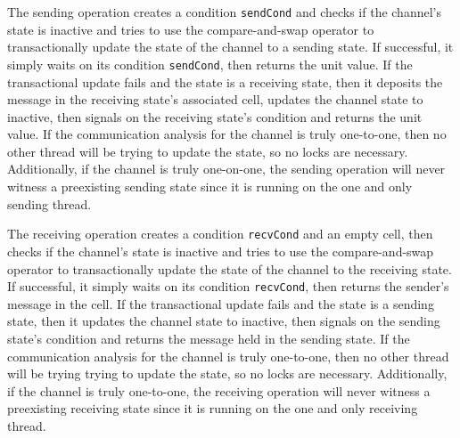 \documentclass[letterpaper, 11pt]{extarticle}
\begin{document}
The sending operation creates a condition \lstinline{sendCond} and checks
if the channel's state is inactive and tries to use the
compare-and-swap operator to transactionally update the state of the channel to a
sending state.
If successful, it simply waits on its condition \lstinline{sendCond}, then returns the unit value.
If the transactional update fails and the state is a receiving state,
then it deposits the message in the receiving state's associated cell,
updates the channel state to inactive, then signals on the receiving state's 
condition and returns the unit value.
If the communication analysis for the channel is
truly one-to-one, then no other thread will be trying to update the state, so no locks are necessary.
Additionally, if the channel is truly one-on-one, the sending operation will never
witness a preexisting sending state since it is running on the one and only sending thread. 

The receiving operation creates a condition \lstinline{recvCond} and an empty cell,
then checks if the channel's state is inactive and tries to use the
compare-and-swap operator to transactionally update the state of the channel to
the receiving state. If successful, it simply waits on its condition \lstinline{recvCond},
then returns the sender's message in the cell.
If the transactional update fails and the state is a sending state,
then it updates the channel state to inactive, then signals on the sending state's
condition and returns the message held in the sending state.
If the communication
analysis for the channel is truly one-to-one, then no other thread will be trying
trying to update the state, so no locks are necessary.
Additionally, if the channel is truly one-to-one, the receiving operation will never
witness a preexisting receiving state since it is running on the one and only receiving thread.
\end{document}
